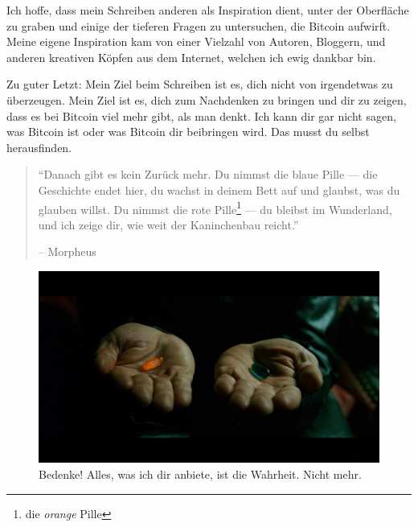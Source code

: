 Ich hoffe, dass mein Schreiben anderen als Inspiration dient, unter der
Oberfläche zu graben und einige der tieferen Fragen zu untersuchen, die Bitcoin
aufwirft. Meine eigene Inspiration kam von einer Vielzahl von Autoren, Bloggern,
und anderen kreativen Köpfen aus dem Internet, welchen ich ewig dankbar bin.

Zu guter Letzt: Mein Ziel beim Schreiben ist es, dich nicht von irgendetwas zu
überzeugen. Mein Ziel ist es, dich zum Nachdenken zu bringen und dir zu zeigen,
dass es bei Bitcoin viel mehr gibt, als man denkt. Ich kann dir gar nicht sagen,
was Bitcoin ist oder was Bitcoin dir beibringen wird. Das musst du selbst
herausfinden.

\begin{quotation}\begin{samepage}
\enquote{Danach gibt es kein Zurück mehr. Du nimmst die blaue Pille --- die
Geschichte endet hier, du wachst in deinem Bett auf und glaubst, was du glauben
willst. Du nimmst die rote Pille\footnote{die \textit{orange} Pille} --- du
bleibst im Wunderland, und ich zeige dir, wie weit der Kaninchenbau reicht.}
\begin{flushright} -- Morpheus
\end{flushright}\end{samepage}\end{quotation}

\begin{figure}
  \includegraphics{assets/images/bitcoin-orange-pill.jpg}
  \caption*{Bedenke! Alles, was ich dir anbiete, ist die Wahrheit. Nicht mehr.}
  \label{fig:bitcoin-orange-pill}
\end{figure}

%
%
%
